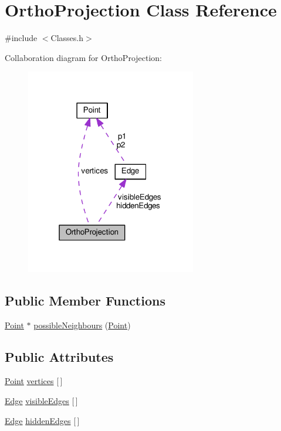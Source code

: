 \hypertarget{class_ortho_projection}{}\section{Ortho\+Projection Class Reference}
\label{class_ortho_projection}


{\ttfamily \#include $<$Classes.\+h$>$}



Collaboration diagram for Ortho\+Projection\+:
\nopagebreak
\begin{figure}[H]
\begin{center}
\leavevmode
\includegraphics[width=211pt]{class_ortho_projection__coll__graph}
\end{center}
\end{figure}
\subsection*{Public Member Functions}
\begin{DoxyCompactItemize}
\item 
\hyperlink{class_point}{Point} $\ast$ \hyperlink{class_ortho_projection_aa0634b80a904634451f03a11db28c33d}{possible\+Neighbours} (\hyperlink{class_point}{Point})
\end{DoxyCompactItemize}
\subsection*{Public Attributes}
\begin{DoxyCompactItemize}
\item 
\hyperlink{class_point}{Point} \hyperlink{class_ortho_projection_a66b7e72014671cf35f4c6728b7baeec6}{vertices} \mbox{[}$\,$\mbox{]}
\item 
\hyperlink{class_edge}{Edge} \hyperlink{class_ortho_projection_a8903896a5a8facc50585ea50584617a1}{visible\+Edges} \mbox{[}$\,$\mbox{]}
\item 
\hyperlink{class_edge}{Edge} \hyperlink{class_ortho_projection_af5ebfefeb5cbc7ba0373697161ce27da}{hidden\+Edges} \mbox{[}$\,$\mbox{]}
\end{DoxyCompactItemize}


